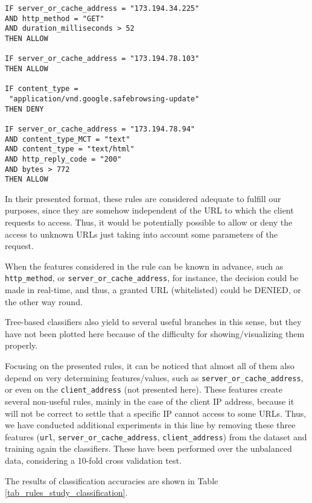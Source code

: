 \documentclass{llncs}
\begin{document}
\begin{small}
\begin{verbatim}
IF server_or_cache_address = "173.194.34.225"
AND http_method = "GET"
AND duration_milliseconds > 52
THEN ALLOW

IF server_or_cache_address = "173.194.78.103"
THEN ALLOW

IF content_type =
 "application/vnd.google.safebrowsing-update"
THEN DENY

IF server_or_cache_address = "173.194.78.94"
AND content_type_MCT = "text"
AND content_type = "text/html"
AND http_reply_code = "200"
AND bytes > 772
THEN ALLOW
\end{verbatim}
\end{small}

In their presented format, these rules are considered adequate to fulfill our purposes, since they are somehow independent of the URL to which the client requests to access. Thus, it would be potentially possible to allow or deny the access to unknown URLs just taking into account some parameters of the request.

When the features considered in the rule can be known in advance, such as \texttt{http\_method}, or \texttt{server\_or\_cache\_address}, for instance, the decision could be made in real-time, and thus, a granted URL (whitelisted) could be DENIED, or the other way round.

Tree-based classifiers also yield to several useful branches in this sense, but they have not been plotted here because of the difficulty for showing/visualizing them properly.

Focusing on the presented rules, it can be noticed that almost all of them also depend on very determining features/values, such as \texttt{server\_or\_cache\_address}, or even on the \texttt{client\_address} (not presented here). These features create several non-useful rules, mainly in the case of the client IP address, because it will not be correct to settle that a specific IP cannot access to some URLs. Thus, we have conducted additional experiments in this line by removing these three features (\texttt{url}, \texttt{server\_or\_cache\_address}, \texttt{client\_address}) from the dataset and training again the classifiers. These have been performed over the unbalanced data, considering a 10-fold cross validation test.

The results of classification accuracies are shown in Table \ref{tab_rules_study_classification}.
\end{document}
